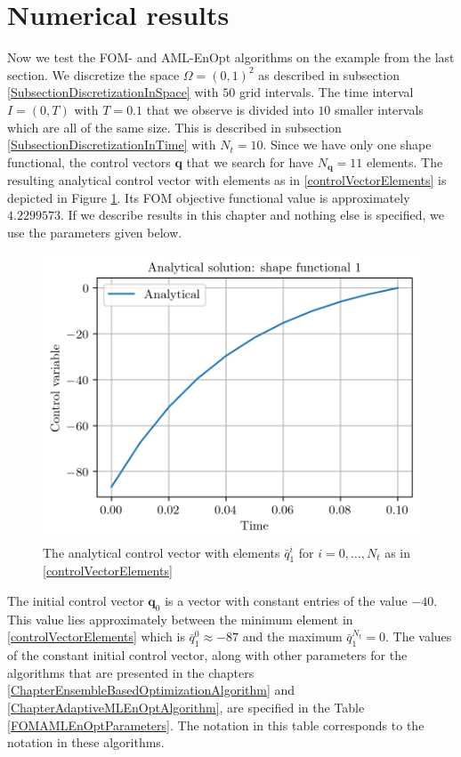 \section{Numerical results}

Now we test the FOM- and AML-EnOpt algorithms on the example from the last section. We discretize the space $\Omega=(0,1)^2$ as described in subsection \ref{SubsectionDiscretizationInSpace} with $50$ grid intervals. The time interval $I=(0,T)$ with $T=0.1$ that we observe is divided into $10$ smaller intervals which are all of the same size. This is described in subsection \ref{SubsectionDiscretizationInTime} with $N_t=10$. Since we have only one shape functional, the control vectors $\mathbf{q}$ that we search for have $N_\mathbf{q}=11$ elements. The resulting analytical control vector with elements as in \eqref{controlVectorElements} is depicted in Figure \ref{AnalyticalControlVectorPlot}. Its FOM objective functional value is approximately $4.2299573$. If we describe results in this chapter and nothing else is specified, we use the parameters given below.\\

\begin{figure}
\centering
\includegraphics{Plots/analyticalControlVector.png}
\caption{\label{AnalyticalControlVectorPlot}The analytical control vector with elements $\bar{q}^i_1$ for $i=0,\dotsc,N_t$ as in \eqref{controlVectorElements}}
\end{figure}

The initial control vector $\mathbf{q}_0$ is a vector with constant entries of the value $-40$. This value lies approximately between the minimum element in \eqref{controlVectorElements} which is $\bar{q}^0_1\approx-87$ and the maximum $\bar{q}^{N_t}_1=0$. The values of the constant initial control vector, along with other parameters for the algorithms that are presented in the chapters \ref{ChapterEnsembleBasedOptimizationAlgorithm} and \ref{ChapterAdaptiveMLEnOptAlgorithm}, are specified in the Table \ref{FOMAMLEnOptParameters}. The notation in this table corresponds to the notation in these algorithms.

